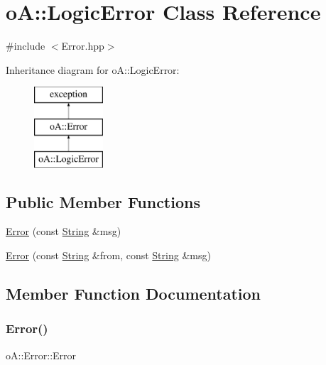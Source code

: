 \hypertarget{classo_a_1_1_logic_error}{}\section{oA\+:\+:Logic\+Error Class Reference}
\label{classo_a_1_1_logic_error}


{\ttfamily \#include $<$Error.\+hpp$>$}

Inheritance diagram for oA\+:\+:Logic\+Error\+:\begin{figure}[H]
\begin{center}
\leavevmode
\includegraphics[height=3.000000cm]{classo_a_1_1_logic_error}
\end{center}
\end{figure}
\subsection*{Public Member Functions}
\begin{DoxyCompactItemize}
\item 
\mbox{\hyperlink{classo_a_1_1_logic_error_a16d10704561d2b756722d71d8703089c}{Error}} (const \mbox{\hyperlink{classo_a_1_1_string}{String}} \&msg)
\item 
\mbox{\hyperlink{classo_a_1_1_logic_error_adf66492ca8b03fa14d09e5bba7cdacbd}{Error}} (const \mbox{\hyperlink{classo_a_1_1_string}{String}} \&from, const \mbox{\hyperlink{classo_a_1_1_string}{String}} \&msg)
\end{DoxyCompactItemize}


\subsection{Member Function Documentation}
\mbox{\label{classo_a_1_1_logic_error_a16d10704561d2b756722d71d8703089c}} 
\subsubsection{\texorpdfstring{Error()}{Error()}\hspace{0.1cm}{\footnotesize\ttfamily [1/2]}}
{\footnotesize\ttfamily o\+A\+::\+Error\+::\+Error\hspace{0.3cm}{\ttfamily [inline]}}

